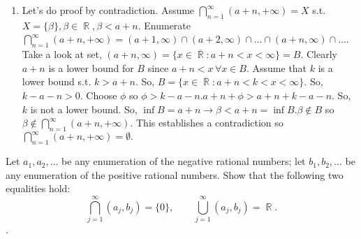 \documentclass[12pt,letterpaper,boxed]{hmcpset}
\DeclareMathOperator{\R}{\mathbb{R}}
\begin{document}
\begin{solution}
\begin{enumerate}
	\item Let's do proof by contradiction. Assume $\bigcap_{n = 1}^{\infty}(a + n,+\infty) = X$ s.t. $X = \{\beta\}, \beta \in \R, \beta < a + n.$ Enumerate $\bigcap_{n = 1}^{\infty}(a + n,+\infty) = (a + 1, \infty)\cap(a + 2, \infty)\cap\dots \cap(a + n, \infty)\cap \dots$. Take a look at set, $(a + n, \infty) = \{x \in \overline{\R} : a+n < x < \infty \} = B.$ Clearly $a + n$ is a lower bound for $B$ since $a+n<x \, \forall x\in B.$ Assume that $k$ is a lower bound s.t. $k > a + n.$ So, $B = \{ x \in \overline{\R} : a + n < k < x < \infty \}$. So, $k - a - n > 0$. Choose $\phi$ so $\phi > k - a - n. a + n + \phi > a + n + k - a - n.$ So, $k$ is not a lower bound. So, $\inf B = a + n \rightarrow \beta < a+ n=\inf B. \beta \notin B$ so $\beta \notin \bigcap_{n = 1}^{\infty}(a + n,+\infty)$. This establishes a contradiction so $\bigcap_{n = 1}^{\infty}(a + n,+\infty) = \emptyset.$
\end{enumerate}
\end{solution}

\begin{problem}[Exercise 5.5.]
Let $a_1, a_2, \dots$ be any enumeration of the negative rational numbers; let $b_1, b_2, \dots$ be any enumeration of the positive rational numbers. Show that the following two equalities hold: $$ \bigcap_{j = 1}^{\infty}(a_j,b_j) = \{0\}, \quad \quad \bigcup_{j=1}^{\infty}(a_j,b_j)=\R.$$.
\end{problem}
\end{document}
